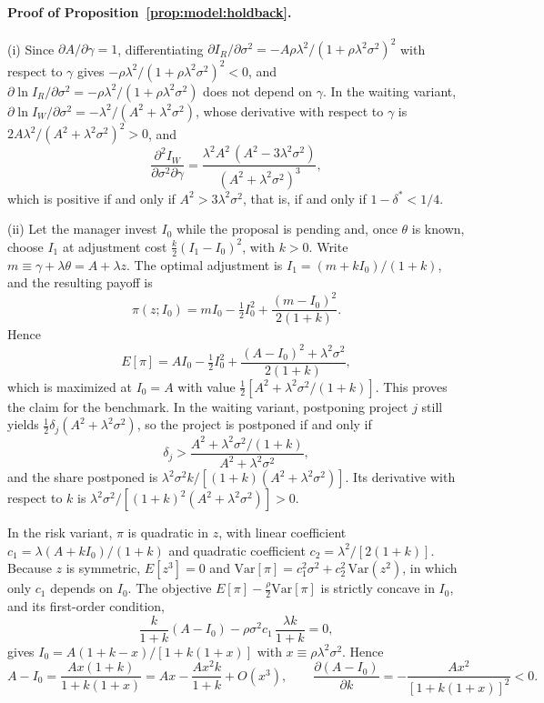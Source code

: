 \paragraph{Proof of Proposition~\ref{prop:model:holdback}.}
(i) Since $\partial A/\partial\gamma=1$, differentiating $\partial I_R/\partial\sigma^{2}=-A\rho\lambda^{2}/(1+\rho\lambda^{2}\sigma^{2})^{2}$ with respect to $\gamma$ gives $-\rho\lambda^{2}/(1+\rho\lambda^{2}\sigma^{2})^{2}<0$, and $\partial\ln I_R/\partial\sigma^{2}=-\rho\lambda^{2}/(1+\rho\lambda^{2}\sigma^{2})$ does not depend on $\gamma$. In the waiting variant, $\partial\ln I_W/\partial\sigma^{2}=-\lambda^{2}/(A^{2}+\lambda^{2}\sigma^{2})$, whose derivative with respect to $\gamma$ is $2A\lambda^{2}/(A^{2}+\lambda^{2}\sigma^{2})^{2}>0$, and
\[
  \frac{\partial^{2}I_W}{\partial\sigma^{2}\partial\gamma}=\frac{\lambda^{2}A^{2}\,(A^{2}-3\lambda^{2}\sigma^{2})}{(A^{2}+\lambda^{2}\sigma^{2})^{3}},
\]
which is positive if and only if $A^{2}>3\lambda^{2}\sigma^{2}$, that is, if and only if $1-\delta^{*}<1/4$.

(ii) Let the manager invest $I_0$ while the proposal is pending and, once $\theta$ is known, choose $I_1$ at adjustment cost $\tfrac{k}{2}(I_1-I_0)^{2}$, with $k>0$. Write $m\equiv\gamma+\lambda\theta=A+\lambda z$. The optimal adjustment is $I_1=(m+kI_0)/(1+k)$, and the resulting payoff is
\[
  \pi(z;I_0)=mI_0-\tfrac12I_0^{2}+\frac{(m-I_0)^{2}}{2(1+k)}.
\]
Hence
\[
  E[\pi]=AI_0-\tfrac12I_0^{2}+\frac{(A-I_0)^{2}+\lambda^{2}\sigma^{2}}{2(1+k)},
\]
which is maximized at $I_0=A$ with value $\tfrac12[A^{2}+\lambda^{2}\sigma^{2}/(1+k)]$. This proves the claim for the benchmark. In the waiting variant, postponing project $j$ still yields $\tfrac12\delta_j(A^{2}+\lambda^{2}\sigma^{2})$, so the project is postponed if and only if
\[
  \delta_j>\frac{A^{2}+\lambda^{2}\sigma^{2}/(1+k)}{A^{2}+\lambda^{2}\sigma^{2}},
\]
and the share postponed is $\lambda^{2}\sigma^{2}k/[(1+k)(A^{2}+\lambda^{2}\sigma^{2})]$. Its derivative with respect to $k$ is $\lambda^{2}\sigma^{2}/[(1+k)^{2}(A^{2}+\lambda^{2}\sigma^{2})]>0$.

In the risk variant, $\pi$ is quadratic in $z$, with linear coefficient $c_1=\lambda(A+kI_0)/(1+k)$ and quadratic coefficient $c_2=\lambda^{2}/[2(1+k)]$. Because $z$ is symmetric, $E[z^{3}]=0$ and $\mathrm{Var}[\pi]=c_1^{2}\sigma^{2}+c_2^{2}\,\mathrm{Var}(z^{2})$, in which only $c_1$ depends on $I_0$. The objective $E[\pi]-\tfrac{\rho}{2}\mathrm{Var}[\pi]$ is strictly concave in $I_0$, and its first-order condition,
\[
  \frac{k}{1+k}(A-I_0)-\rho\sigma^{2}c_1\,\frac{\lambda k}{1+k}=0,
\]
gives $I_0=A(1+k-x)/[1+k(1+x)]$ with $x\equiv\rho\lambda^{2}\sigma^{2}$. Hence
\[
  A-I_0=\frac{Ax(1+k)}{1+k(1+x)}=Ax-\frac{Ax^{2}k}{1+k}+O(x^{3}),\qquad
  \frac{\partial(A-I_0)}{\partial k}=-\frac{Ax^{2}}{[1+k(1+x)]^{2}}<0.
\]

